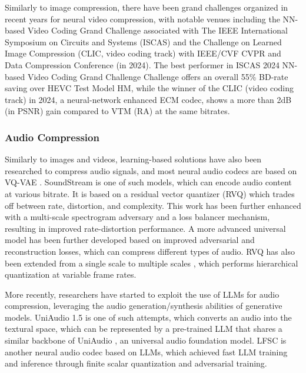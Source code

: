 \documentclass[11pt,a4paper]{article}
\begin{document}
Similarly to image compression, there have been grand challenges organized in recent years for neural video compression, with notable venues including the NN-based Video Coding Grand Challenge associated with The IEEE International Symposium on Circuits and Systems (ISCAS) and the Challenge on Learned Image Compression (CLIC, video coding track) with IEEE/CVF CVPR and Data Compression Conference (in 2024). The best performer in ISCAS 2024 NN-based Video Coding Grand Challenge Challenge offers an overall 55\% BD-rate saving over HEVC Test Model HM, while the winner of the CLIC (video coding track) in 2024, a neural-network enhanced ECM codec, shows a more than 2dB (in PSNR) gain compared to VTM (RA) at the same bitrates. 

\subsubsection{Audio Compression}

Similarly to images and videos, learning-based solutions have also been researched to compress audio signals, and most neural audio codecs are based on VQ-VAE \cite{Oord:Neural:2017}. SoundStream \cite{zeghidour2021soundstream} is one of such models, which can encode audio content at various bitrate. It is based on a residual vector quantizer (RVQ) which trades off between rate, distortion, and complexity. This work has been further enhanced with a multi-scale spectrogram adversary and a loss balancer mechanism, resulting in improved rate-distortion performance. A more advanced universal model has been further developed \cite{kumar2024high} based on improved adversarial and reconstruction losses, which can compress different types of audio. RVQ has also been extended from a single scale to multiple scales \cite{siuzdak2024snac}, which performs hierarchical quantization at variable frame rates. 

More recently, researchers have started to exploit the use of LLMs for audio compression, leveraging the audio generation/synthesis abilities of generative models. UniAudio 1.5 \cite{yang2024uniaudio} is one of such attempts, which converts an audio into the textural space, which can be represented by a pre-trained LLM that shares a similar backbone of UniAudio \cite{yang2023uniaudio}, an universal audio foundation model. LFSC is another neural audio codec based on LLMs, which achieved fast LLM training and inference through finite scalar quantization and adversarial training. 

\end{document}
